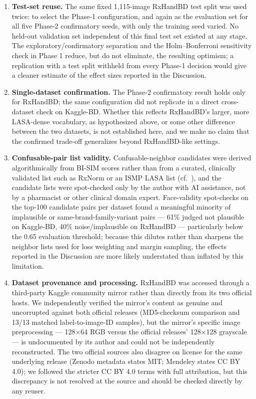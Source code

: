 \documentclass[fleqn,10pt]{wlpeerj}
\begin{document}
\begin{enumerate}
\def\labelenumi{\arabic{enumi}.}
\item
  \textbf{Test-set reuse.} The same fixed 1,115-image RxHandBD test split was used twice: to select the Phase-1 configuration, and again as the evaluation set for all five Phase-2 confirmatory seeds, with only the training seed varied. No held-out validation set independent of this final test set existed at any stage. The exploratory/confirmatory separation and the Holm--Bonferroni sensitivity check in Phase 1 reduce, but do not eliminate, the resulting optimism; a replication with a test split withheld from every Phase-1 decision would give a cleaner estimate of the effect sizes reported in the Discussion.
\item
  \textbf{Single-dataset confirmation.} The Phase-2 confirmatory result holds only for RxHandBD; the same configuration did not replicate in a direct cross-dataset check on Kaggle-BD. Whether this reflects RxHandBD's larger, more LASA-dense vocabulary, as hypothesized above, or some other difference between the two datasets, is not established here, and we make no claim that the confirmed trade-off generalizes beyond RxHandBD-like settings.
\item
  \textbf{Confusable-pair list validity.} Confusable-neighbor candidates were derived algorithmically from BI-SIM scores rather than from a curated, clinically validated list such as RxNorm or an ISMP LASA list (cf.\ \citealp{kondrak2004identification,kondrak2006automatic}), and the candidate lists were spot-checked only by the author with AI assistance, not by a pharmacist or other clinical domain expert. Face-validity spot-checks on the top-100 candidate pairs per dataset found a meaningful minority of implausible or same-brand-family-variant pairs --- 61\% judged not plausible on Kaggle-BD, 40\% noise/implausible on RxHandBD --- particularly below the 0.65 evaluation threshold; because this dilutes rather than sharpens the neighbor lists used for loss weighting and margin sampling, the effects reported in the Discussion are more likely understated than inflated by this limitation.
\item
  \textbf{Dataset provenance and processing.} RxHandBD was accessed through a third-party Kaggle community mirror rather than directly from its two official hosts. We independently verified the mirror's content as genuine and uncorrupted against both official releases (MD5-checksum comparison and 13/13 matched label-to-image-ID samples), but the mirror's specific image preprocessing --- 128×64 RGB versus the official releases' 128×128 grayscale --- is undocumented by its author and could not be independently reconstructed. The two official sources also disagree on license for the same underlying release (Zenodo metadata states MIT; Mendeley states CC BY 4.0); we followed the stricter CC BY 4.0 terms with full attribution, but this discrepancy is not resolved at the source and should be checked directly by any reuser.

\end{enumerate}
\end{document}
